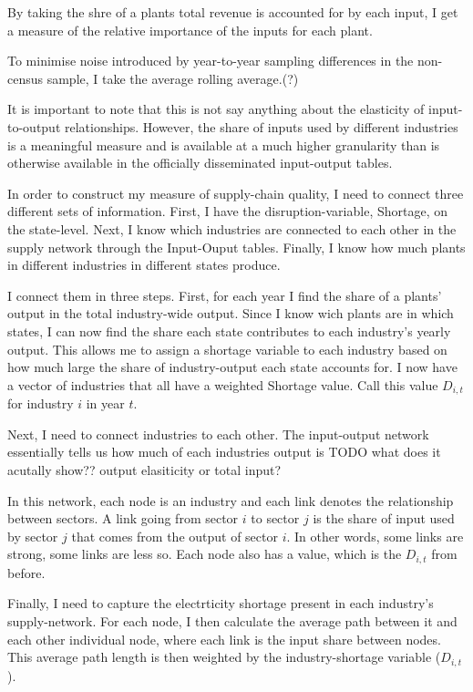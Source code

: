 \documentclass[11pt]{article}
\begin{document}
By taking the shre of a plants total revenue is accounted for by each input, I get a measure of the relative importance of the inputs for each plant. 

To minimise noise introduced by year-to-year sampling differences in the non-census sample, I take the average rolling average.(?)

It is important to note that this is not say anything about the elasticity of input-to-output relationships. However, the share of inputs used by different industries is a meaningful measure and is available at a much higher granularity than is otherwise available in the officially disseminated input-output tables. 


In order to construct my measure of supply-chain quality, I need to connect three different sets of information. First, I have the disruption-variable, Shortage, on the state-level. Next, I know which industries are connected to each other in the supply network through the Input-Ouput tables. Finally, I know how much plants in different industries in different states produce.

I connect them in three steps. First, for each year I find the share of a plants' output in the total industry-wide output. Since I know wich plants are in which states, I can now find the share each state contributes to each industry's yearly output. This allows me to assign a shortage variable to each industry based on how much large the share of industry-output each state accounts for. I now have a vector of industries that all have a weighted Shortage value. Call this value $D_{i,t}$ for industry $i$ in year $t$.

Next, I need to connect industries to each other. The input-output network essentially tells us how much of each industries output is TODO what does it acutally show?? output elasiticity or total input? 

In this network, each node is an industry and each link denotes the relationship between sectors. A link going from sector $i$ to sector $j$ is the share of input used by sector $j$ that comes from the output of sector $i$. In other words, some links are strong, some links are less so. Each node also has a value, which is the $D_{i,t}$ from before. 

Finally, I need to capture the electrticity shortage present in each industry's supply-network. For each node, I then calculate the average path between it and each other individual node, where each link is the input share between nodes. This average path length is then weighted by the industry-shortage variable ($D_{i,t}$).
 
\end{document}
